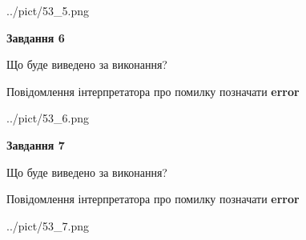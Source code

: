 \documentclass[10pt, ukrainian]{article}
\begin{document}
{\begin {large}
\begin{center}
	{../pict/53_5.png}
\end{center}
\newpage

{\begin {center}\textbf{Завдання 6}\end {center}}\par
Що буде виведено за виконання? \par
Повідомлення інтерпретатора про помилку позначати \textbf{error}

\begin{center}
	{../pict/53_6.png}
\end{center}
\newpage

{\begin {center}\textbf{Завдання 7}\end {center}}\par
Що буде виведено за виконання? \par
Повідомлення інтерпретатора про помилку позначати \textbf{error}

\begin{center}
	{../pict/53_7.png}
\end{center}
\newpage

\end {large}}
\end{document}
